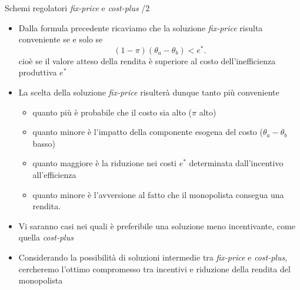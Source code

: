 \documentclass[aspectratio=149,11pt]{beamer}
\begin{document}
\begin{frame}{Schemi regolatori \emph{fix-price} e \emph{cost-plus} /2}
\begin{itemize}
\item Dalla formula precedente ricaviamo che la soluzione \emph{fix-price} risulta
conveniente se e solo se
\begin{equation*}
   (1-\pi)(\theta_a-\theta_b)<e^*.
\end{equation*}
cioè se il valore atteso della rendita è superiore al costo
dell'inefficienza produttiva $e^*$
\item La scelta della soluzione \emph{fix-price} risulterà dunque tanto più
conveniente
\begin{itemize}
\item quanto più è probabile che il costo sia alto ($\pi$ alto)
\item quanto minore è l'impatto della componente esogena del costo ($\theta_a-\theta_b$ basso)
\item quanto maggiore è la riduzione nei costi $e^*$ determinata dall'incentivo
all'efficienza
\item quanto minore è l'avversione al fatto che il monopolista consegua
una rendita.
\end{itemize}
\item Vi saranno casi nei quali è preferibile una soluzione meno incentivante,
come quella \emph{cost-plus}
\item Considerando la possibilità di soluzioni intermedie tra \emph{fix-price} e
\emph{cost-plus}, cercheremo l'ottimo compromesso tra incentivi e riduzione della
rendita del monopolista
\end{itemize}
\end{frame}
\end{document}
